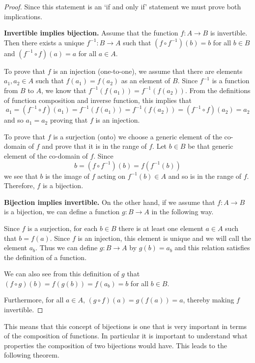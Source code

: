 \documentclass[
]{book}
\theoremstyle{definition}
\theoremstyle{definition}
\theoremstyle{definition}
\theoremstyle{remark}
\begin{document}
\begin{proof}
{}Since this statement is an `if and only if' statement we must prove both implications.

\textbf{Invertible implies bijection.} Assume that the function \(f:A \rightarrow B\) is invertible. Then there exists a unique \(f^{-1}:B\rightarrow A\) such that \((f\circ f^{-1})(b)=b\) for all \(b\in B\) and \((f^{-1}\circ f)(a)=a\) for all \(a\in A\).

To prove that \(f\) is an injection (one-to-one), we assume that there are elements \(a_1, a_2\in A\) such that \(f(a_1)=f(a_2)\) as an element of \(B\). Since \(f^{-1}\) is a function from \(B\) to \(A\), we know that \(f^{-1}(f(a_1))=f^{-1}(f(a_2))\). From the definitions of function composition and inverse function, this implies that \[a_1 = (f^{-1}\circ f)(a_1)= f^{-1}(f(a_1))=f^{-1}(f(a_2))= (f^{-1}\circ f)(a_2)=a_2\] and so \(a_1=a_2\) proving that \(f\) is an injection.

To prove that \(f\) is a surjection (onto) we choose a generic element of the co-domain of \(f\) and prove that it is in the range of \(f\). Let \(b\in B\) be that generic element of the co-domain of \(f\). Since \[b = (f\circ f^{-1})(b) = f(f^{-1}(b))\] we see that \(b\) is the image of \(f\) acting on \(f^{-1}(b) \in A\) and so is in the range of \(f\). Therefore, \(f\) is a bijection.

\textbf{Bijection implies invertible.} On the other hand, if we assume that \(f:A\rightarrow B\) is a bijection, we can define a function \(g: B \rightarrow A\) in the following way.

Since \(f\) is a surjection, for each \(b\in B\) there is at least one element \(a\in A\) such that \(b=f(a)\). Since \(f\) is an injection, this element is unique and we will call the element \(a_b\). Thus we can define \(g:B\rightarrow A\) by \(g(b)=a_b\) and this relation satisfies the definition of a function.

We can also see from this definition of \(g\) that \((f\circ g)(b)=f(g(b))=f(a_b)=b\) for all \(b\in B\).

Furthermore, for all \(a\in A\), \((g \circ f)(a) = g(f(a))=a\), thereby making \(f\) invertible.
\end{proof}

This means that this concept of bijections is one that is very important in terms of the composition of functions. In particular it is important to understand what properties the composition of two bijections would have. This leads to the following theorem.
\end{document}
